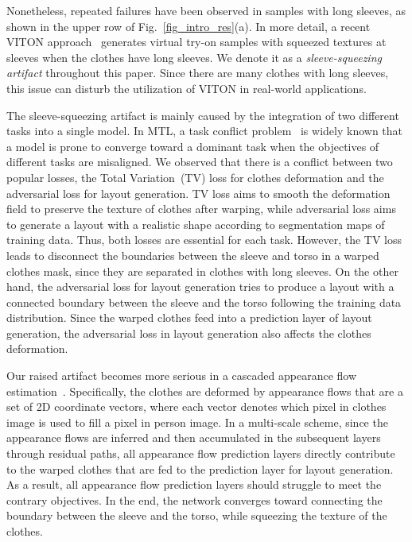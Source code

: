 \documentclass[letterpaper]{article} %
\begin{document}
Nonetheless, repeated failures have been observed in samples with long sleeves, as shown in the upper row of Fig.~\ref{fig_intro_res}(a).
In more detail, a recent VITON approach~\cite{lee2022hrviton} generates virtual try-on samples with squeezed textures at sleeves when the clothes have long sleeves. 
We denote it as a \textit{sleeve-squeezing artifact} throughout this paper.
Since there are many clothes with long sleeves, this issue can disturb the utilization of VITON in real-world applications.

The sleeve-squeezing artifact is mainly caused by the integration of two different tasks into a single model.
In MTL, a task conflict problem~\cite{shi2023recon} is widely known that a model is prone to converge toward a dominant task when the objectives of different tasks are misaligned.
We observed that there is a conflict between two popular losses, the Total Variation~(TV) loss for clothes deformation and the adversarial loss for layout generation.
TV loss aims to smooth the deformation field to preserve the texture of clothes after warping, while adversarial loss aims to generate a layout with a realistic shape according to segmentation maps of training data. Thus, both losses are essential for each task. However, the TV loss leads to disconnect the boundaries between the sleeve and torso in a warped clothes mask, since they are separated in clothes with long sleeves. On the other hand, the adversarial loss for layout generation tries to produce a layout with a connected boundary between the sleeve and the torso following the training data distribution. Since the warped clothes feed into a prediction layer of layout generation, the adversarial loss in layout generation also affects the clothes deformation.

Our raised artifact becomes more serious in a cascaded appearance flow estimation~\cite{ge2021parser,zhou2016view}.
Specifically, the clothes are deformed by appearance flows that are a set of 2D coordinate vectors, where each vector denotes which pixel in clothes image is used to fill a pixel in person image.
In a multi-scale scheme, since the appearance flows are inferred and then accumulated in the subsequent layers through residual paths, all appearance flow prediction layers directly contribute to the warped clothes that are fed to the prediction layer for layout generation.
As a result, all appearance flow prediction layers should struggle to meet the contrary objectives.
In the end, the network converges toward connecting the boundary between the sleeve and the torso, while squeezing the texture of the clothes.
\end{document}
